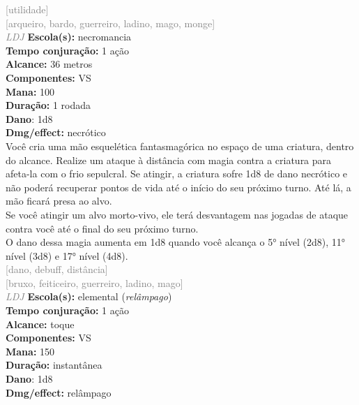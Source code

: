 \documentclass{RPG_Adventure}[2021/10/20]
\begin{document}
{\scriptsize \textcolor{gray}{[utilidade]\\}}
{\scriptsize \textcolor{gray}{[arqueiro, bardo, guerreiro, ladino, mago, monge]\\}}
{\tiny \textcolor{gray}{\textit{LDJ}}}
{\small \t \textbf{Escola(s):} necromancia\\\t \textbf{Tempo conjuração:} 1 ação\\\t \textbf{Alcance:} 36 metros\\\t \textbf{Componentes:} VS\\\t \textbf{Mana:} 100\\\t \textbf{Duração:} 1 rodada\\\t \textbf{Dano}: 1d8\\\t \textbf{Dmg/effect:} necrótico\\}
{\normalsize Você cria uma mão esquelética fantasmagórica no espaço de uma criatura, dentro do alcance. Realize um ataque à distância com magia contra a criatura para afeta-la com o frio sepulcral. Se atingir, a criatura sofre 1d8 de dano necrótico e não poderá recuperar pontos de vida até o início do seu próximo turno. Até lá, a mão ficará presa ao alvo.\\Se você atingir um alvo morto-vivo, ele terá desvantagem nas jogadas de ataque contra você até o final do seu próximo turno.\\O dano dessa magia aumenta em 1d8 quando você alcança o 5° nível (2d8), 11° nível (3d8) e 17° nível (4d8).\\}
{\scriptsize \textcolor{gray}{[dano, debuff, distância]\\}}
{\scriptsize \textcolor{gray}{[bruxo, feiticeiro, guerreiro, ladino, mago]\\}}
{\tiny \textcolor{gray}{\textit{LDJ}}}
{\small \t \textbf{Escola(s):} elemental (\textit{relâmpago})\\\t \textbf{Tempo conjuração:} 1 ação\\\t \textbf{Alcance:} toque\\\t \textbf{Componentes:} VS\\\t \textbf{Mana:} 150\\\t \textbf{Duração:} instantânea\\\t \textbf{Dano}: 1d8\\\t \textbf{Dmg/effect:} relâmpago\\}
\end{document}
